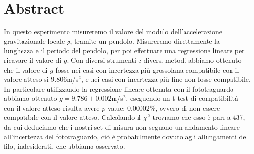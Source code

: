 \section{Abstract}
In questo esperimento misureremo il valore del modulo dell'accelerazione gravitazionale locale $g$, tramite un pendolo. Misureremo direttamente la lunghezza e il periodo del pendolo, per poi effettuare una regressione lineare per ricavare il valore di $g$. Con diversi strumenti e diversi metodi abbiamo ottenuto che il valore di $g$ fosse nei casi con incertezza più grossolana compatibile con il valore atteso si $9.806$m/s$^2$, e nei casi con incertezza più fine non fosse compatibile.\\
In particolare utilizzando la regressione lineare ottenuta con il fototraguardo abbiamo ottenuto $g=9.786\pm0.002$m/s$^2$, eseguendo un t-test di compatibilità con il valore atteso risulta avere $p$-value: 0.00002\%, ovvero di non essere compatibile con il valore atteso. Calcolando il $\chi^2$ troviamo che esso è pari a 437, da cui deduciamo che i nostri set di misura non seguono un andamento lineare all'incertezza del fototraguardo, ciò è probabilmente dovuto agli allungamenti del filo, indesiderati, che abbiamo osservato.\\